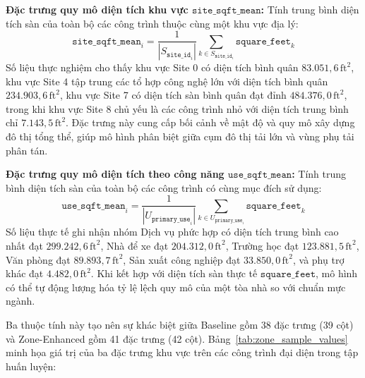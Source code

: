\begin{enumerate}
    \textbf{Đặc trưng quy mô diện tích khu vực $\texttt{site\_sqft\_mean}$:} Tính trung bình diện tích sàn của toàn bộ các công trình thuộc cùng một khu vực địa lý:
    \begin{equation*}
        \texttt{site\_sqft\_mean}_i = \frac{1}{|S_{\texttt{site\_id}_i}|} \sum_{k \in S_{\texttt{site\_id}_i}} \texttt{square\_feet}_k
    \end{equation*}
    Số liệu thực nghiệm cho thấy khu vực Site 0 có diện tích bình quân $83.051{,}6\,\text{ft}^2$, khu vực Site 4 tập trung các tổ hợp công nghệ lớn với diện tích bình quân $234.903{,}6\,\text{ft}^2$, khu vực Site 7 có diện tích sàn bình quân đạt đỉnh $484.376{,}0\,\text{ft}^2$, trong khi khu vực Site 8 chủ yếu là các công trình nhỏ với diện tích trung bình chỉ $7.143{,}5\,\text{ft}^2$. Đặc trưng này cung cấp bối cảnh về mật độ và quy mô xây dựng đô thị tổng thể, giúp mô hình phân biệt giữa cụm đô thị tải lớn và vùng phụ tải phân tán.
    
    \textbf{Đặc trưng quy mô diện tích theo công năng $\texttt{use\_sqft\_mean}$:} Tính trung bình diện tích sàn của toàn bộ các công trình có cùng mục đích sử dụng:
    \begin{equation*}
        \texttt{use\_sqft\_mean}_i = \frac{1}{|U_{\texttt{primary\_use}_i}|} \sum_{k \in U_{\texttt{primary\_use}_i}} \texttt{square\_feet}_k
    \end{equation*}
    Số liệu thực tế ghi nhận nhóm Dịch vụ phức hợp có diện tích trung bình cao nhất đạt $299.242{,}6\,\text{ft}^2$, Nhà để xe đạt $204.312{,}0\,\text{ft}^2$, Trường học đạt $123.881{,}5\,\text{ft}^2$, Văn phòng đạt $89.893{,}7\,\text{ft}^2$, Sản xuất công nghiệp đạt $33.850{,}0\,\text{ft}^2$, và phụ trợ khác đạt $4.482{,}0\,\text{ft}^2$. Khi kết hợp với diện tích sàn thực tế $\texttt{square\_feet}$, mô hình có thể tự động lượng hóa tỷ lệ lệch quy mô của một tòa nhà so với chuẩn mực ngành.

    Ba thuộc tính này tạo nên sự khác biệt giữa Baseline gồm 38 đặc trưng (39 cột) và Zone-Enhanced gồm 41 đặc trưng (42 cột). Bảng~\ref{tab:zone_sample_values} minh họa giá trị của ba đặc trưng khu vực trên các công trình đại diện trong tập huấn luyện:


\end{enumerate}
